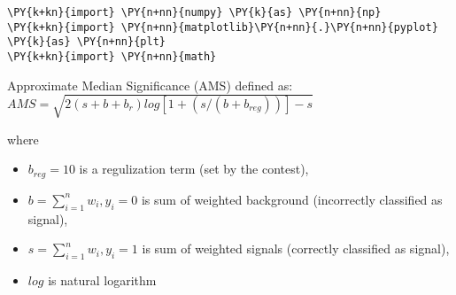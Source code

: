 
{\par%
\vspace{-1\baselineskip}%
}%
\begin{notebookcell}[]%
\begin{addmargin}[\cellleftmargin]{0em}%
{\smaller%
\par%
%
\vspace{-1\smallerfontscale}%
\begin{Verbatim}[commandchars=\\\{\}]
\PY{k+kn}{import} \PY{n+nn}{numpy} \PY{k}{as} \PY{n+nn}{np}
\PY{k+kn}{import} \PY{n+nn}{matplotlib}\PY{n+nn}{.}\PY{n+nn}{pyplot} \PY{k}{as} \PY{n+nn}{plt}
\PY{k+kn}{import} \PY{n+nn}{math}
\end{Verbatim}
%
\par%
\vspace{-1\smallerfontscale}}%
\end{addmargin}
\end{notebookcell}


    Approximate Median Significance (AMS) defined as:
\(AMS = \sqrt{2 { (s + b + b_r) log[1 + (s/(b+b_{reg}))] - s}}\)

where

\begin{itemize}
\tightlist
\item
  \(b_{reg} = 10\) is a regulization term (set by the contest),
\item
  \(b = \sum_{i=1}^{n} w_i, y_i=0\) is sum of weighted background
  (incorrectly classified as signal),
\item
  \(s = \sum_{i=1}^{n} w_i, y_i=1\) is sum of weighted signals
  (correctly classified as signal),
\item
  \(log\) is natural logarithm
\end{itemize}


